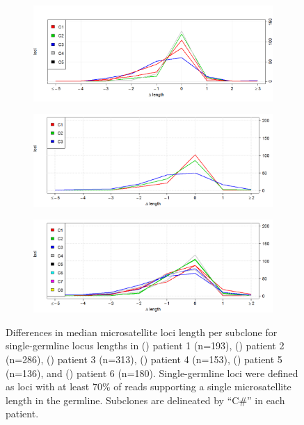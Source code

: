 \begin{figure}[htp]
\begin{subfigure}{0.49\textwidth}
		\includegraphics[width=\linewidth,keepaspectratio]{images/msiclones/patient4_median_shift}
		\caption{}\label{fig:msiclones:median_shift_4}
	\end{subfigure}
	\par
	\begin{subfigure}{0.49\textwidth}
		\includegraphics[width=\linewidth,keepaspectratio]{images/msiclones/patient5_median_shift}
		\caption{}\label{fig:msiclones:median_shift_5}
	\end{subfigure}%
	\hfill%
	\begin{subfigure}{0.49\textwidth}
		\includegraphics[width=\linewidth,keepaspectratio]{images/msiclones/patient6_median_shift}
		\caption{}\label{fig:msiclones:median_shift_6}
	\end{subfigure}
	\caption[Differences in median microsatellite loci length per subclone.]{Differences in median microsatellite loci length per subclone for single-germline locus lengths in () patient 1 (n=193), () patient 2 (n=286), () patient 3 (n=313), () patient 4 (n=153), () patient 5 (n=136), and () patient 6 (n=180). Single-germline loci were defined as loci with at least 70\% of reads supporting a single microsatellite length in the germline. Subclones are delineated by ``C\#'' in each patient.}
	\label{fig:msiclones:median_shift}
\end{figure}

